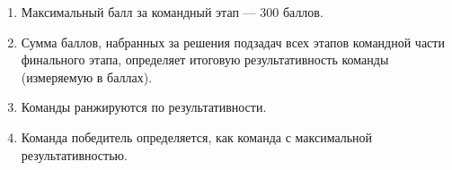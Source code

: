 \begin{enumerate}
    \item Максимальный балл за командный этап --- 300 баллов.
    \item Сумма баллов, набранных за решения подзадач всех этапов командной части финального этапа, определяет итоговую результативность команды (измеряемую в баллах).
    \item Команды ранжируются по результативности.
    \item Команда победитель определяется, как команда с максимальной результативностью.
\end{enumerate} 